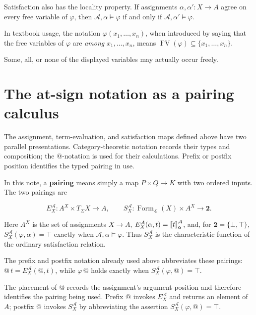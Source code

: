 \documentclass[11pt]{article}
\makeatletter
\newcommand{\llbracket}{\mathopen{[\mkern-3mu[}}
\newcommand{\rrbracket}{\mathclose{]\mkern-3mu]}}
\newcommand{\atsign}{\mathord{@}}
\theoremstyle{definition}
\makeatother
\begin{document}
Satisfaction also has the locality property. If assignments
\(\alpha,\alpha':X\to A\) agree on every free variable of \(\varphi\),
then \(\mathcal A,\alpha\models\varphi\) if and only if
\(\mathcal A,\alpha'\models\varphi\).

In textbook usage, the notation \(\varphi(x_1,\ldots,x_n)\), when introduced
by saying that the free variables of \(\varphi\) are \emph{among}
\(x_1,\ldots,x_n\), means
\(\operatorname{FV}(\varphi)\subseteq\{x_1,\ldots,x_n\}\).

Some, all, or none of the displayed variables may actually occur freely.

\section{The at-sign notation as a pairing calculus}
\label{at-sign-pairing-calculus}

The assignment, term-evaluation, and satisfaction maps defined above have two
parallel presentations. Category-theoretic notation records their types and
composition; the $\atsign$-notation is used for their calculations. Prefix or
postfix position identifies the typed pairing in use.

In this note, a \textbf{pairing} means simply a map $P\times Q\to K$ with two
ordered inputs. The two pairings are

\[
E_X^{\mathcal A}:A^X\times T_\Sigma X\longrightarrow A,
\qquad
S_X^{\mathcal A}:
\operatorname{Form}_{\mathcal L}(X)\times A^X
\longrightarrow\mathbf 2.
\]

Here $A^X$ is the set of assignments $X\to A$,
$E_X^{\mathcal A}(\alpha,t)=\llbracket t\rrbracket^{\mathcal A}_\alpha$,
and, for $\mathbf 2=\{\bot,\top\}$,
$S_X^{\mathcal A}(\varphi,\alpha)=\top$ exactly when
$\mathcal A,\alpha\models\varphi$. Thus $S_X^{\mathcal A}$ is the
characteristic function of the ordinary satisfaction relation.

The prefix and postfix notation already used above abbreviates these pairings:
$\atsign\,t=E_X^{\mathcal A}(\atsign,t)$, while
$\varphi\,\atsign$ holds exactly when
$S_X^{\mathcal A}(\varphi,\atsign)=\top$.

The placement of $\atsign$ records the assignment's argument position and
therefore identifies the pairing being used. Prefix $\atsign$ invokes
$E_X^{\mathcal A}$ and returns an element of $A$; postfix $\atsign$ invokes
$S_X^{\mathcal A}$ by abbreviating the assertion
$S_X^{\mathcal A}(\varphi,\atsign)=\top$.
\end{document}
